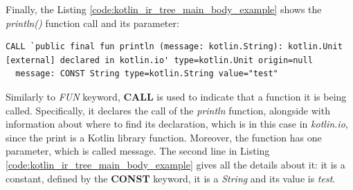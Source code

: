 Finally, the Listing \ref{code:kotlin_ir_tree_main_body_example} shows the \textit{println()} function call and its parameter:
\begin{lstlisting}[caption={Kotlin IR tree of the body block content of the main function in Listing \ref{code:kotlin_for_ir_tree}}, captionpos=b, label={code:kotlin_ir_tree_main_body_example}]
CALL `public final fun println (message: kotlin.String): kotlin.Unit [external] declared in kotlin.io' type=kotlin.Unit origin=null
  message: CONST String type=kotlin.String value="test"
\end{lstlisting}
Similarly to \textit{FUN} keyword, \textbf{CALL} is used to indicate that a function it is being called. Specifically, it declares the call of the \textit{println} function, alongside with information about where to find its declaration, which is in this case in \textit{kotlin.io}, since the print is a Kotlin library function. Moreover, the function has one parameter, which is called message. The second line in Listing \ref{code:kotlin_ir_tree_main_body_example} gives all the details about it: it is a constant, defined by the \textbf{CONST} keyword, it is a \textit{String} and its value is \textit{test}.

